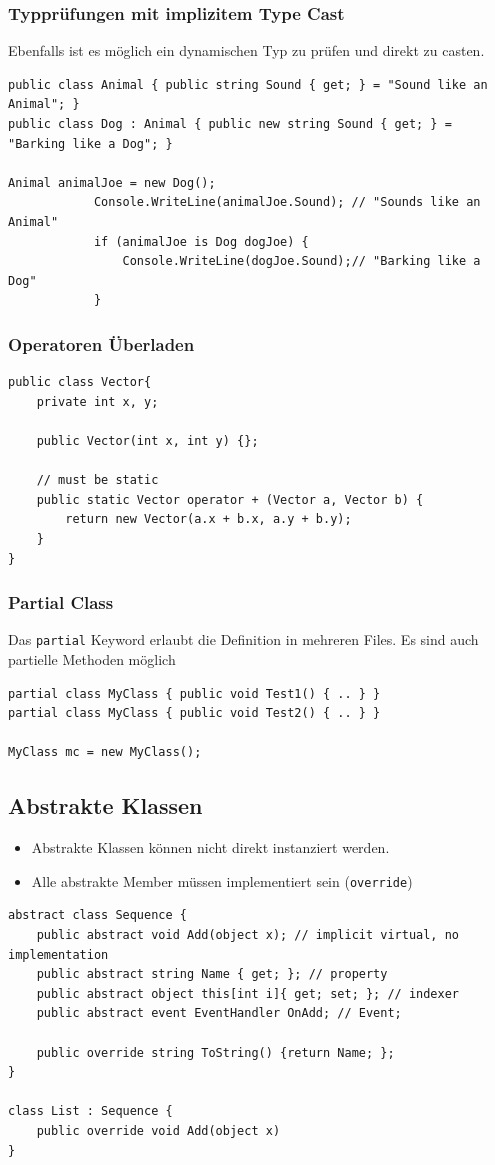 \documentclass[
a4paper,
oneside,
10pt,
fleqn,
headsepline,
toc=listofnumbered, 
bibliography=totocnumbered]{scrartcl}
\begin{document}
\subsubsection{Typprüfungen mit implizitem Type Cast}
Ebenfalls ist es möglich ein dynamischen Typ zu prüfen und direkt zu casten.
\begin{lstlisting}
public class Animal { public string Sound { get; } = "Sound like an Animal"; }
public class Dog : Animal { public new string Sound { get; } = "Barking like a Dog"; }

Animal animalJoe = new Dog();
            Console.WriteLine(animalJoe.Sound); // "Sounds like an Animal"
            if (animalJoe is Dog dogJoe) {
                Console.WriteLine(dogJoe.Sound);// "Barking like a Dog"
            }
\end{lstlisting}


\subsubsection{Operatoren Überladen}
\begin{lstlisting}
public class Vector{
	private int x, y;
	
	public Vector(int x, int y) {};
	
	// must be static
	public static Vector operator + (Vector a, Vector b) {
		return new Vector(a.x + b.x, a.y + b.y);
	}						
}
\end{lstlisting}


\subsubsection{Partial Class}
Das \lstinline|partial| Keyword erlaubt die Definition in mehreren Files. Es sind auch partielle Methoden möglich
\begin{lstlisting}
partial class MyClass { public void Test1() { .. } }
partial class MyClass { public void Test2() { .. } }

MyClass mc = new MyClass();
\end{lstlisting}

\subsection{Abstrakte Klassen}
\begin{itemize}
	\item Abstrakte Klassen können nicht direkt instanziert werden. 
	\item Alle abstrakte Member müssen implementiert sein (\lstinline|override|)
\end{itemize}
\begin{lstlisting}
abstract class Sequence {
	public abstract void Add(object x); // implicit virtual, no implementation
	public abstract string Name { get; }; // property
	public abstract object this[int i]{ get; set; }; // indexer
	public abstract event EventHandler OnAdd; // Event;
	
	public override string ToString() {return Name; }; 
}

class List : Sequence {
	public override void Add(object x)
}
\end{lstlisting}
\end{document}
